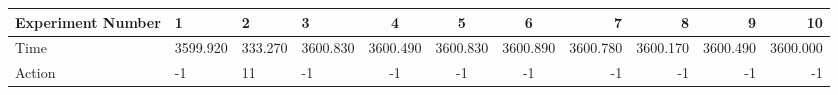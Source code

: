 \documentclass[8pt]{article}
\begin{document}
\begin{landscape}
\begin{tabular}{ | l | l | l | l | c | c | c | r | r | r | r | }
 \hline 
Experiment Number & 1 & 2 & 3 & 4 & 5 & 6 & 7 & 8 & 9 & 10\\ \hline
Time & 3599.920 & 333.270 & 3600.830 & 3600.490 & 3600.830 & 3600.890 & 3600.780 & 3600.170 & 3600.490 & 3600.000\\ \hline
Action & -1 & 11 & -1 & -1 & -1 & -1 & -1 & -1 & -1 & -1\\ \hline\end{tabular}
\end{landscape}
\end{document}
